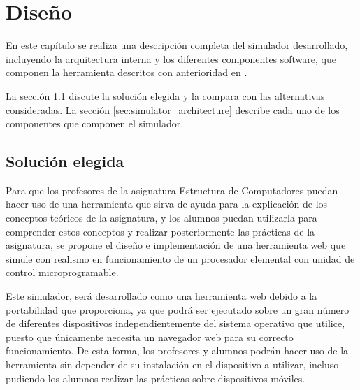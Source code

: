 \chead[]{}
\renewcommand{\headrulewidth}{0.5pt}

\lfoot[]{}
\cfoot[]{}
\rfoot[]{}
\renewcommand{\footrulewidth}{0pt}

\chapter{Diseño}
\label{ch:design}

En este capítulo se realiza una descripción completa del simulador desarrollado, incluyendo la arquitectura interna y los diferentes componentes software, que componen la herramienta descritos con anterioridad en \cite{mateos2016wepsim}.

La sección \ref{sec:solution_selection} discute la solución elegida y la compara con las alternativas consideradas. La sección \ref{sec:simulator_architecture} describe cada uno de los componentes que componen el simulador.

\section{Solución elegida}
\label{sec:solution_selection}

Para que los profesores de la asignatura Estructura de Computadores puedan hacer uso de una herramienta que sirva de ayuda para la explicación de los conceptos teóricos de la asignatura, y los alumnos puedan utilizarla para comprender estos conceptos y realizar posteriormente las prácticas de la asignatura, se propone el diseño e implementación de una herramienta web que simule con realismo en funcionamiento de un procesador elemental con unidad de control microprogramable.

Este simulador, será desarrollado como una herramienta web debido a la portabilidad que proporciona, ya que podrá ser ejecutado sobre un gran número de diferentes dispositivos independientemente del sistema operativo que utilice, puesto que únicamente necesita un navegador web para su correcto funcionamiento. De esta forma, los profesores y alumnos podrán hacer uso de la herramienta sin depender de su instalación en el dispositivo a utilizar, incluso pudiendo los alumnos realizar las prácticas sobre dispositivos móviles.

